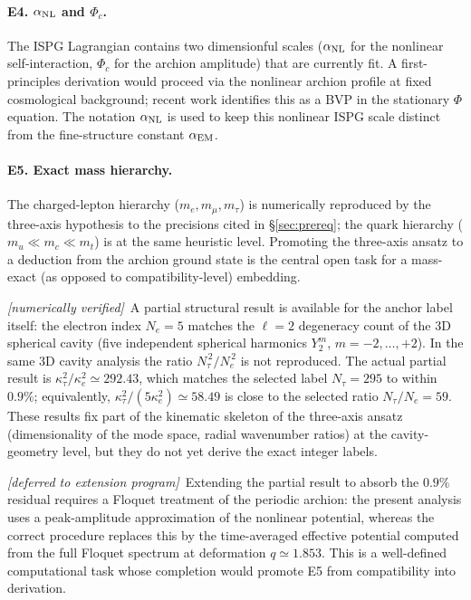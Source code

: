 \documentclass[11pt]{article}
\newcommand{\numerical}{\textit{[numerically verified]}}
\newcommand{\deferred}{\textit{[deferred to extension program]}}
\begin{document}
\paragraph{E4. $\alpha_{\rm NL}$ and $\Phi_c$.}
The ISPG Lagrangian contains two dimensionful scales
($\alpha_{\rm NL}$ for the nonlinear self-interaction, $\Phi_c$
for the archion amplitude) that
are currently fit. A first-principles derivation would proceed
via the nonlinear archion profile at fixed cosmological
background; recent work identifies this as a BVP in the
stationary $\Phi$ equation. The notation $\alpha_{\rm NL}$ is used
to keep this nonlinear ISPG scale distinct from the fine-structure
constant $\alpha_{\rm EM}$.

\paragraph{E5. Exact mass hierarchy.}
The charged-lepton hierarchy ($m_e,m_\mu,m_\tau$) is numerically
reproduced by the three-axis hypothesis to the precisions cited
in \S\ref{sec:prereq}; the quark hierarchy
($m_u\ll m_c\ll m_t$) is at the same heuristic level. Promoting
the three-axis ansatz to a deduction from the archion ground
state is the central open task for a mass-exact (as opposed to
compatibility-level) embedding.

\numerical\ A partial structural result is available for the
anchor label itself: the electron index $N_e=5$ matches the
$\ell=2$ degeneracy count of the 3D spherical cavity (five
independent spherical harmonics $Y_2^{m}$, $m=-2,\ldots,+2$).
In the same 3D cavity analysis the ratio $N_\tau^{\,2}/N_e^{\,2}$
is not reproduced. The actual partial result is
$\kappa_\tau^{2}/\kappa_e^{2}\simeq 292.43$, which matches the
selected label $N_\tau=295$ to within $0.9\%$; equivalently,
$\kappa_\tau^{2}/(5\kappa_e^{2})\simeq 58.49$ is close to the
selected ratio $N_\tau/N_e=59$. These results fix part of the
kinematic skeleton of the three-axis ansatz (dimensionality of
the mode space, radial wavenumber ratios) at the
cavity-geometry level, but they do not yet derive the exact
integer labels.

\deferred\ Extending the partial result to absorb the $0.9\%$
residual requires a Floquet treatment of the periodic archion:
the present analysis uses a peak-amplitude approximation of the
nonlinear potential, whereas the correct procedure replaces this
by the time-averaged effective potential computed from the full
Floquet spectrum at deformation $q\simeq 1.853$. This is a
well-defined computational task whose completion would promote
E5 from compatibility into derivation.
\end{document}
